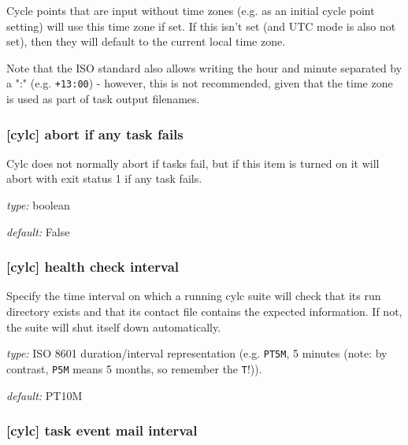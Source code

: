Cycle points that are input without time zones (e.g. as an initial cycle point
setting) will use this time zone if set. If this isn't set (and UTC mode is
also not set), then they will default to the current local time zone.

Note that the ISO standard also allows writing the hour and minute separated
by a ":" (e.g. \lstinline=+13:00=) - however, this is not recommended, given
that the time zone is used as part of task output filenames.

\subsubsection[abort if any task fails]{[cylc] \textrightarrow abort if any task fails}

Cylc does not normally abort if tasks fail, but if this item is turned
on it will abort with exit status 1 if any task fails.

\begin{myitemize}
    \item {\em type:} boolean
    \item {\em default:} False
\end{myitemize}

\subsubsection[health check interval]{[cylc] \textrightarrow health check interval}
\label{health-check-interval}

Specify the time interval on which a running cylc suite will check that its run
directory exists and that its contact file contains the expected information.
If not, the suite will shut itself down automatically.

\begin{myitemize}
    \item {\em type:} ISO 8601 duration/interval representation (e.g.
 \lstinline=PT5M=, 5 minutes (note: by contrast, \lstinline=P5M= means 5
 months, so remember the \lstinline=T=!)).
    \item {\em default:} PT10M
\end{myitemize}

\subsubsection[task event mail interval]{[cylc] \textrightarrow task event mail interval}
\label{task-event-mail-interval}

